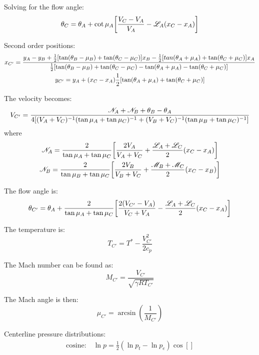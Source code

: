 \documentclass[11pt, fleqn, twoside]{report}
\DeclarePairedDelimiter\bk{\lbrack}{\rbrack}
\begin{document}
Solving for the flow angle:
\begin{equation*}
    \theta_C = \theta_A + \cot{\mu_A}\bk*{\frac{V_C - V_A}{V_A} - \mathscr{L}_A(x_C - x_A)}
\end{equation*}

Second order positions:
\begin{gather*}
    x_{C'} = \frac{y_A - y_B + \frac{1}{2}\bk*{\tan(\theta_B - \mu_B) + \tan(\theta_C - \mu_C)}x_B - \frac{1}{2}\bk*{tan(\theta_A + \mu_A) + \tan(\theta_C + \mu_C)}x_A}{\frac{1}{2}\bk*{\tan(\theta_B - \mu_B) + \tan(\theta_C - \mu_C) - \tan(\theta_A + \mu_A) - \tan(\theta_C + \mu_C)}} \\
    y_{C'} = y_A + (x_C - x_A)\frac{1}{2}\bk*{\tan(\theta_A + \mu_A) + \tan(\theta_C + \mu_C)}
\end{gather*}

The velocity becomes:
\begin{equation*}
    V_{C'} = \frac{\mathscr{N}_A + \mathscr{N}_B + \theta_B - \theta_A}{4\bk*{(V_A + V_C)^{-1}(\tan{\mu_A} + \tan{\mu_C})^{-1} + (V_B + V_C)^{-1}(\tan{\mu_B} + \tan{\mu_C})^{-1}}}
\end{equation*}
where
\begin{gather*}
    \mathscr{N}_A = \frac{2}{\tan{\mu_A} + \tan{\mu_C}}\bk*{\frac{2V_A}{V_A + V_C} + \frac{\mathscr{L}_A + \mathscr{L}_C}{2}(x_C - x_A)} \\
    \mathscr{N}_B = \frac{2}{\tan{\mu_B} + \tan{\mu_C}}\bk*{\frac{2V_B}{V_B + V_C} + \frac{\mathscr{M}_B + \mathscr{M}_C}{2}(x_C - x_B)}
\end{gather*}

The flow angle is:
\begin{equation*}
    \theta_{C'} = \theta_A + \frac{2}{\tan{\mu_A} + \tan{\mu_C}}\bk*{\frac{2(V_{C'} - V_A)}{V_C + V_A} - \frac{\mathscr{L}_A + \mathscr{L}_C}{2}(x_C - x_A)}
\end{equation*}

The temperature is:
\begin{equation*}
    T_{C'} = T^* - \frac{V_{C'}^2}{2c_p}
\end{equation*}

The Mach number can be found as:
\begin{equation*}
    M_{C'} = \frac{V_{C'}}{\sqrt{\gamma RT_{C'}}}
\end{equation*}

The Mach angle is then:
\begin{equation}
    \mu_{C'} = \arcsin(\frac{1}{M_{C'}})
\end{equation}

Centerline pressure distributions:
\begin{gather*}
    \text{cosine:}\quad \ln{p} = \frac{1}{2}(\ln{p_t} - \ln{p_e})\cos[]
\end{gather*}
\end{document}
